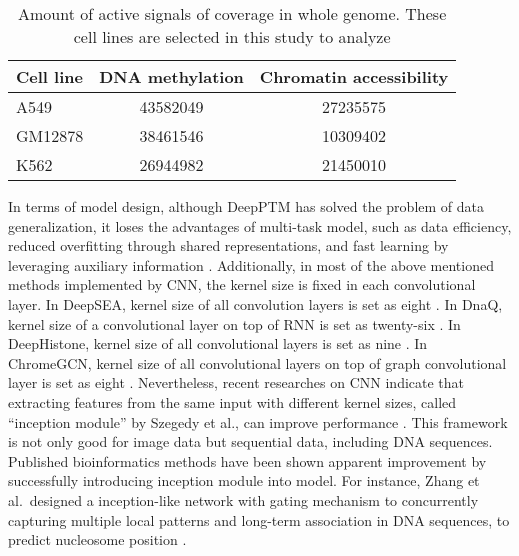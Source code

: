 \begin{table}[H]%
    \centering
    \begin{tabular}{lcc}
        \hline
        Cell line &  DNA methylation & Chromatin accessibility \\\hline
        A549 & 43582049 & 27235575 \\
        GM12878 & 38461546 & 10309402 \\
        K562 & 26944982 & 21450010 \\\hline
    \end{tabular}
    \renewcommand{\baselinestretch}{1.0}
    \captionsetup{labelfont=bf}
    \caption[Amount of active signals of coverage in whole genome]{Amount of active signals of coverage in whole genome. These cell lines are selected in this study to analyze}
    \label{t2}
\end{table}

In terms of model design, although DeepPTM has solved the problem of data generalization, it loses the advantages of multi-task model, such as data efficiency, reduced overfitting through shared representations, and fast learning by leveraging auxiliary information \cite{crawshaw2020multi}. Additionally, in most of the above mentioned methods implemented by CNN, the kernel size is fixed in each convolutional layer. In DeepSEA, kernel size of all convolution layers is set as eight \cite{zhou2015predicting}. In DnaQ, kernel size of a convolutional layer on top of RNN is set as twenty-six \cite{quang2016danq}. In DeepHistone, kernel size of all convolutional layers is set as nine \cite{yin2019deephistone}. In ChromeGCN, kernel size of all convolutional layers on top of graph convolutional layer is set as eight \cite{lanchantin2020graph}. Nevertheless, recent researches on CNN indicate that extracting features from the same input with different kernel sizes, called “inception module” by Szegedy et al., can improve performance \cite{szegedy2015going}\cite{tan2019mixconv}. This framework is not only good for image data but sequential data, including DNA sequences. Published bioinformatics methods have been shown apparent improvement by successfully introducing inception module into model. For instance, Zhang et al.\ designed a inception-like network with gating mechanism to concurrently capturing multiple local patterns and long-term association in DNA sequences, to predict nucleosome position \cite{zhang2018lenup}.
